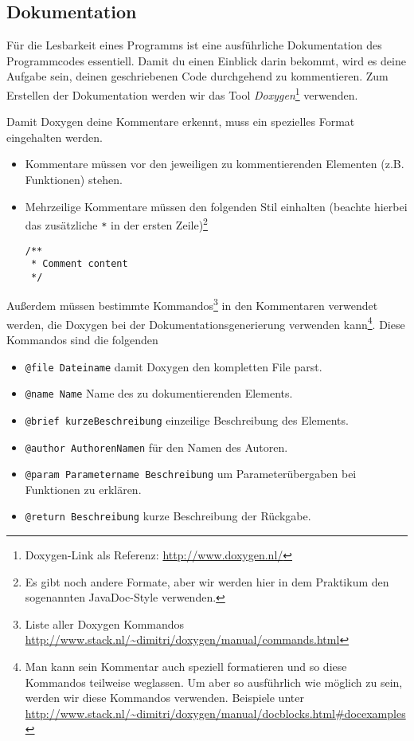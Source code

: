 \subsection{Dokumentation} \label{basics:doc}
Für die Lesbarkeit eines Programms ist eine ausführliche Dokumentation des Programmcodes essentiell.
Damit du einen Einblick darin bekommt, wird es deine Aufgabe sein, deinen geschriebenen Code durchgehend zu kommentieren. 
Zum Erstellen der Dokumentation werden wir das Tool \emph{Doxygen}\footnote{Doxygen-Link als Referenz: \url{http://www.doxygen.nl/}} verwenden.

Damit Doxygen deine Kommentare erkennt, muss ein spezielles Format eingehalten werden.
\begin{itemize}
    \item Kommentare müssen vor den jeweiligen zu kommentierenden Elementen (z.B. Funktionen) stehen.
    \item{Mehrzeilige Kommentare müssen den folgenden Stil einhalten (beachte hierbei das zusätzliche \lstinline{*} in der ersten Zeile)\footnote{Es gibt noch andere Formate, aber wir werden hier in dem Praktikum den sogenannten JavaDoc-Style verwenden.}
        \begin{lstlisting}
/**
 * Comment content
 */
        \end{lstlisting}}
\end{itemize}

Außerdem müssen bestimmte Kommandos\footnote{Liste aller Doxygen Kommandos \url{http://www.stack.nl/~dimitri/doxygen/manual/commands.html}} in den Kommentaren verwendet werden, die Doxygen bei der Dokumentationsgenerierung verwenden kann\footnote{Man kann sein Kommentar auch speziell formatieren und so diese Kommandos teilweise weglassen.
Um aber so ausführlich wie möglich zu sein, werden wir diese Kommandos verwenden.
Beispiele unter \url{http://www.stack.nl/~dimitri/doxygen/manual/docblocks.html\#docexamples}}.
Diese Kommandos sind die folgenden

\begin{itemize}
    \item \lstinline{@file Dateiname} damit Doxygen den kompletten File parst.
    \item \lstinline{@name Name} Name des zu dokumentierenden Elements.
    \item \lstinline{@brief kurzeBeschreibung} einzeilige Beschreibung des Elements.
    \item \lstinline{@author AuthorenNamen} für den Namen des Autoren.
    \item \lstinline{@param Parametername Beschreibung} um Parameterübergaben bei Funktionen zu erklären.
    \item \lstinline{@return Beschreibung} kurze Beschreibung der Rückgabe.
\end{itemize}

